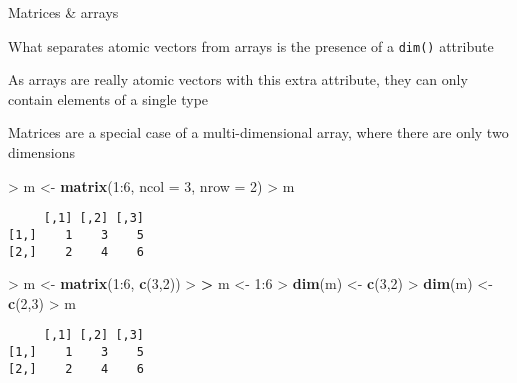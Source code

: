 \documentclass[10pt,ignorenonframetext,compress, aspectratio=169]{beamer}
\newenvironment{Shaded}{\begin{snugshade}}{\end{snugshade}}
\newcommand{\KeywordTok}[1]{\textcolor[rgb]{0.13,0.29,0.53}{\textbf{{#1}}}}
\newcommand{\DataTypeTok}[1]{\textcolor[rgb]{0.13,0.29,0.53}{{#1}}}
\newcommand{\DecValTok}[1]{\textcolor[rgb]{0.00,0.00,0.81}{{#1}}}
\newcommand{\StringTok}[1]{\textcolor[rgb]{0.31,0.60,0.02}{{#1}}}
\newcommand{\ErrorTok}[1]{\textcolor[rgb]{0.64,0.00,0.00}{\textbf{{#1}}}}
\newcommand{\NormalTok}[1]{{#1}}
\begin{document}
\begin{frame}[fragile]{Matrices \& arrays}

What separates atomic vectors from arrays is the presence of a
\texttt{dim()} attribute

As arrays are really atomic vectors with this extra attribute, they can
only contain elements of a single type

Matrices are a special case of a multi-dimensional array, where there
are only two dimensions

\begin{Shaded}
\begin{Highlighting}[]
\NormalTok{>}\StringTok{ }\NormalTok{m <-}\StringTok{ }\KeywordTok{matrix}\NormalTok{(}\DecValTok{1}\NormalTok{:}\DecValTok{6}\NormalTok{, }\DataTypeTok{ncol =} \DecValTok{3}\NormalTok{, }\DataTypeTok{nrow =} \DecValTok{2}\NormalTok{)}
\NormalTok{>}\StringTok{ }\NormalTok{m}
\end{Highlighting}
\end{Shaded}

\begin{verbatim}
     [,1] [,2] [,3]
[1,]    1    3    5
[2,]    2    4    6
\end{verbatim}

\begin{Shaded}
\begin{Highlighting}[]
\NormalTok{>}\StringTok{ }\NormalTok{m <-}\StringTok{ }\KeywordTok{matrix}\NormalTok{(}\DecValTok{1}\NormalTok{:}\DecValTok{6}\NormalTok{, }\KeywordTok{c}\NormalTok{(}\DecValTok{3}\NormalTok{,}\DecValTok{2}\NormalTok{))}
\NormalTok{>}\StringTok{ }
\ErrorTok{>}\StringTok{ }\NormalTok{m <-}\StringTok{ }\DecValTok{1}\NormalTok{:}\DecValTok{6}
\NormalTok{>}\StringTok{ }\KeywordTok{dim}\NormalTok{(m) <-}\StringTok{ }\KeywordTok{c}\NormalTok{(}\DecValTok{3}\NormalTok{,}\DecValTok{2}\NormalTok{)}
\NormalTok{>}\StringTok{ }\KeywordTok{dim}\NormalTok{(m) <-}\StringTok{ }\KeywordTok{c}\NormalTok{(}\DecValTok{2}\NormalTok{,}\DecValTok{3}\NormalTok{)}
\NormalTok{>}\StringTok{ }\NormalTok{m}
\end{Highlighting}
\end{Shaded}

\begin{verbatim}
     [,1] [,2] [,3]
[1,]    1    3    5
[2,]    2    4    6
\end{verbatim}

\end{frame}
\end{document}
